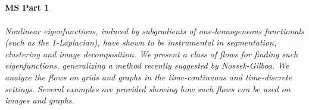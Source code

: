 \begin{multicols}{2}
\\ 
    \\
    \\\\
    \noindent\textbf{MS Part 1}\\
\\  
    \textit{Nonlinear eigenfunctions, induced by subgradients of one-homogeneous
functionals (such as the 1-Laplacian), have shown to be instrumental in
segmentation, clustering and image decomposition.  We present a class
of flows for finding such eigenfunctions, generalizing a method recently
suggested by Nossek-Gilboa.  We analyze the flows on grids and graphs
in the time-continuous and time-discrete settings. 
Several examples are provided showing how such flows can be
used on images and graphs.}\\
\\ 
    \\
    \\\\
\end{multicols}

